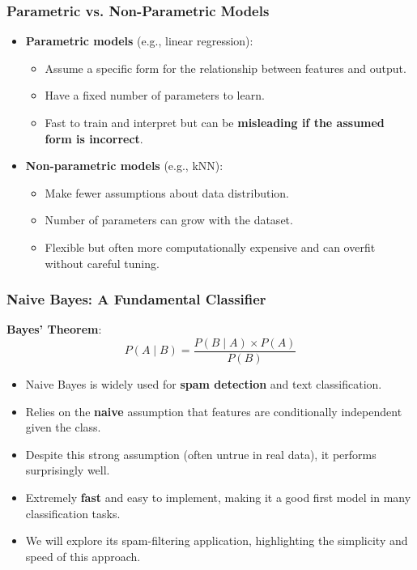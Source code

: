 \documentclass[aspectratio=169]{beamer}
\begin{document}
\begin{frame}
    \frametitle{Parametric vs. Non-Parametric Models}
    \begin{itemize}
        \item \textbf{Parametric models} (e.g., linear regression):
            \begin{itemize}
                \item Assume a specific form for the relationship between features and output.
                \item Have a fixed number of parameters to learn.
                \item Fast to train and interpret but can be \textbf{misleading if the assumed form is incorrect}.
            \end{itemize}
		\pause
        \item \textbf{Non-parametric models} (e.g., kNN):
            \begin{itemize}
                \item Make fewer assumptions about data distribution.
                \item Number of parameters can grow with the dataset.
                \item Flexible but often more computationally expensive and can overfit without careful tuning.
            \end{itemize}
    \end{itemize}
\end{frame}


\begin{frame}
    \frametitle{Naive Bayes: A Fundamental Classifier}
    \textbf{Bayes' Theorem}:
    \[
        P(A \mid B) = \frac{P(B \mid A) \times P(A)}{P(B)}
    \]
    \begin{itemize}
        \item Naive Bayes is widely used for \textbf{spam detection} and text classification.
        \item Relies on the \textbf{naive} assumption that features are conditionally independent given the class.
        \item Despite this strong assumption (often untrue in real data), it performs surprisingly well.
        \item Extremely \textbf{fast} and easy to implement, making it a good first model in many classification tasks.
        \item We will explore its spam-filtering application, highlighting the simplicity and speed of this approach.
    \end{itemize}
\end{frame}
\end{document}
